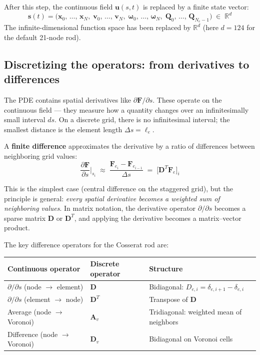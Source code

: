 \documentclass[11pt]{article}
\newcommand{\vect}[1]{\mathbf{#1}}
\newcommand{\mat}[1]{\mathbf{#1}}
\newcommand{\Real}{\mathbb{R}}
\newcommand{\dds}[1]{\frac{\partial #1}{\partial s}}
\begin{document}
After this step, the continuous field $\vect{u}(s, t)$ is replaced by a finite state vector:
\begin{equation}
  \vect{s}(t) = \bigl(\vect{x}_0,\, \dots,\, \vect{x}_N,\;
                       \vect{v}_0,\, \dots,\, \vect{v}_N,\;
                       \bm{\omega}_0,\, \dots,\, \bm{\omega}_N,\;
                       \mat{Q}_0,\, \dots,\, \mat{Q}_{N_e-1}\bigr)
  \;\in\; \Real^{d}
  \label{eq:state-vector}
\end{equation}
The infinite-dimensional function space has been replaced by $\Real^d$ (here $d = 124$ for the default 21-node rod).

\subsection{Discretizing the operators: from derivatives to differences}

The PDE contains spatial derivatives like $\partial \vect{F} / \partial s$.
These operate on the continuous field --- they measure how a quantity changes over an infinitesimally small interval $ds$.
On a discrete grid, there is no infinitesimal interval; the smallest distance is the element length $\Delta s = \ell_e$.

A \textbf{finite difference} approximates the derivative by a ratio of differences between neighboring grid values:
\begin{equation}
  \dds{\vect{F}}\bigg|_{s_i}
  \;\approx\;
  \frac{\vect{F}_{e_i} - \vect{F}_{e_{i-1}}}{\Delta s}
  \;=\;
  \bigl[\mat{D}^T \vect{F}_e\bigr]_i
  \label{eq:fd-approximation}
\end{equation}

This is the simplest case (central difference on the staggered grid), but the principle is general: \emph{every spatial derivative becomes a weighted sum of neighboring values}.
In matrix notation, the derivative operator $\partial/\partial s$ becomes a sparse matrix $\mat{D}$ or $\mat{D}^T$, and applying the derivative becomes a matrix--vector product.

The key difference operators for the Cosserat rod are:

\begin{table}[H]
\centering
\renewcommand{\arraystretch}{1.4}
\begin{tabular}{@{}p{3.8cm}p{3.5cm}p{4.5cm}@{}}
\toprule
\textbf{Continuous operator} & \textbf{Discrete operator} & \textbf{Structure} \\
\midrule
$\partial/\partial s$ (node $\to$ element) &
  $\mat{D}$ &
  Bidiagonal: $D_{e,i} = \delta_{e,i+1} - \delta_{e,i}$ \\
$\partial/\partial s$ (element $\to$ node) &
  $\mat{D}^T$ &
  Transpose of $\mat{D}$ \\
Average (node $\to$ Voronoi) &
  $\mat{A}_v$ &
  Tridiagonal: weighted mean of neighbors \\
Difference (node $\to$ Voronoi) &
  $\mat{D}_v$ &
  Bidiagonal on Voronoi cells \\
\bottomrule
\end{tabular}
\end{table}
\end{document}
